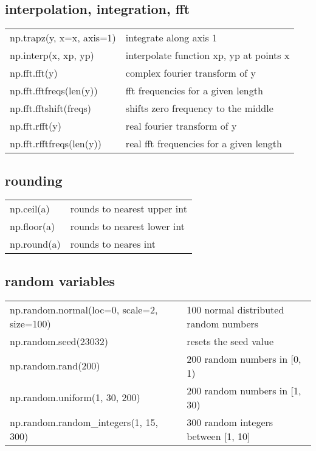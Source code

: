 \documentclass[10pt, a4paper, twocolumn]{article}
\begin{document}
\subsection*{interpolation, integration, fft}
\begin{tabular}{ p{} p{} }
    np.trapz(y, x=x, axis=1) & integrate along axis 1\\
        np.interp(x, xp, yp) & interpolate function xp, yp at points x\\
               np.fft.fft(y) & complex fourier transform of y\\
     np.fft.fftfreqs(len(y)) & fft frequencies for a given length\\
    np.fft.fftshift(freqs)   & shifts zero frequency to the middle\\
               np.fft.rfft(y) & real fourier transform of y\\
     np.fft.rfftfreqs(len(y)) & real fft frequencies for a given length\\
\end{tabular}

\subsection*{rounding}
\begin{tabular}{ p{} p{} }
    np.ceil(a) & rounds to nearest upper int\\
   np.floor(a) & rounds to nearest lower int\\
   np.round(a) & rounds to neares int\\
\end{tabular}

\subsection*{random variables}
\begin{tabular}{ p{} p{} }
    np.random.normal(loc=0, scale=2, size=100) & 100 normal distributed random numbers\\
                         np.random.seed(23032) & resets the seed value\\
                           np.random.rand(200) & 200 random numbers in [0, 1)\\
         np.random.uniform(1, 30, 200)         & 200 random numbers in [1, 30)\\
        np.random.random\_integers(1, 15, 300) & 300 random integers between [1, 10]\\
\end{tabular}
\end{document}
